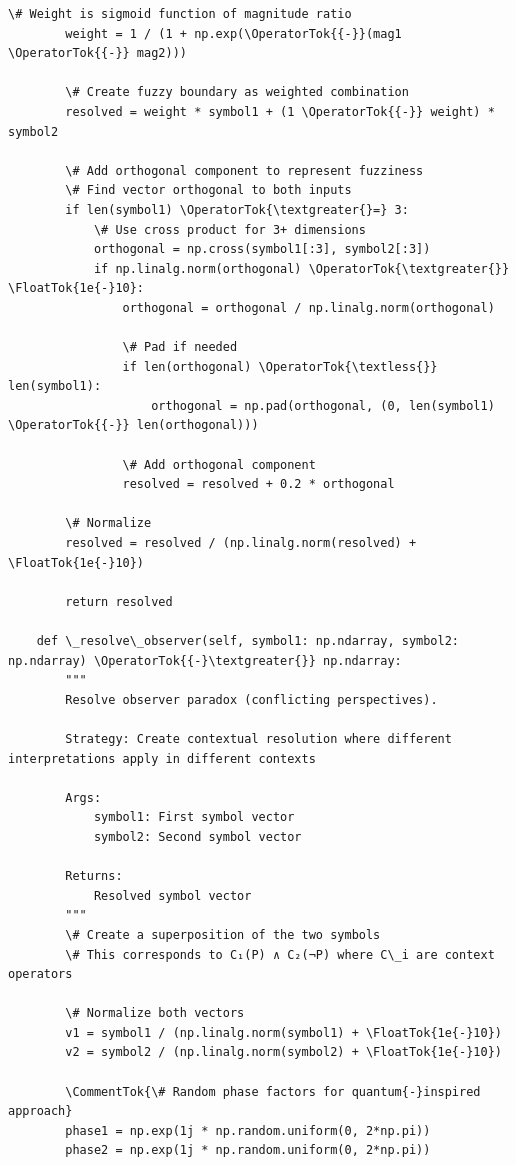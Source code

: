 \documentclass[12pt]{article}
\begin{document}
\begin{lstlisting}[basicstyle=\ttfamily\small]
        \# Weight is sigmoid function of magnitude ratio
        weight = 1 / (1 + np.exp(\OperatorTok{{-}}(mag1 \OperatorTok{{-}} mag2)))
        
        \# Create fuzzy boundary as weighted combination
        resolved = weight * symbol1 + (1 \OperatorTok{{-}} weight) * symbol2
        
        \# Add orthogonal component to represent fuzziness
        \# Find vector orthogonal to both inputs
        if len(symbol1) \OperatorTok{\textgreater{}=} 3:
            \# Use cross product for 3+ dimensions
            orthogonal = np.cross(symbol1[:3], symbol2[:3])
            if np.linalg.norm(orthogonal) \OperatorTok{\textgreater{}} \FloatTok{1e{-}10}:
                orthogonal = orthogonal / np.linalg.norm(orthogonal)
                
                \# Pad if needed
                if len(orthogonal) \OperatorTok{\textless{}} len(symbol1):
                    orthogonal = np.pad(orthogonal, (0, len(symbol1) \OperatorTok{{-}} len(orthogonal)))
                
                \# Add orthogonal component
                resolved = resolved + 0.2 * orthogonal
        
        \# Normalize
        resolved = resolved / (np.linalg.norm(resolved) + \FloatTok{1e{-}10})
        
        return resolved
    
    def \_resolve\_observer(self, symbol1: np.ndarray, symbol2: np.ndarray) \OperatorTok{{-}\textgreater{}} np.ndarray:
        """
        Resolve observer paradox (conflicting perspectives).
        
        Strategy: Create contextual resolution where different interpretations apply in different contexts
        
        Args:
            symbol1: First symbol vector
            symbol2: Second symbol vector
            
        Returns:
            Resolved symbol vector
        """
        \# Create a superposition of the two symbols
        \# This corresponds to C₁(P) ∧ C₂(¬P) where C\_i are context operators
        
        \# Normalize both vectors
        v1 = symbol1 / (np.linalg.norm(symbol1) + \FloatTok{1e{-}10})
        v2 = symbol2 / (np.linalg.norm(symbol2) + \FloatTok{1e{-}10})
        
        \CommentTok{\# Random phase factors for quantum{-}inspired approach}
        phase1 = np.exp(1j * np.random.uniform(0, 2*np.pi))
        phase2 = np.exp(1j * np.random.uniform(0, 2*np.pi))
        

\end{lstlisting}
\end{document}
